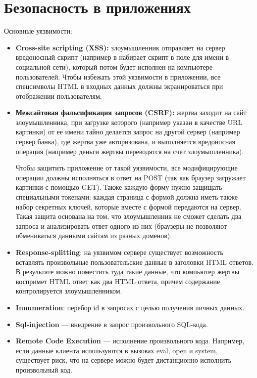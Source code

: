 \section{Безопасность в приложениях} %
Основные уязвимости:
\begin{itemize}
  \item \textbf{Cross-site scripting (XSS):} злоумышленник отправляет на сервер вредоносный скрипт (например в набирает скрипт в поле для имени в социальной сети), который потом будет исполнен на компьютере пользователей. Чтобы избежать этой уязвимости в приложении, все спецсимволы HTML в входных данных должны экранироваться при отображении пользователям.

  \item \textbf{Межсайтовая фальсификация запросов (CSRF):} жертва заходит на сайт злоумышленника, при загрузке которого (например указан в качестве URL картинки) от ее имени тайно делается запрос на другой сервер (например сервер банка), где жертва уже авторизована, и выполняется вредоносная операция (например деньги жертвы переводятся на счет злоумышленника).

  Чтобы защитить приложение от такой уязвимости, все модифицирующие операции должны исполняться в ответ на POST (так как браузер загружает картинки с помощью GET). Также каждую форму нужно защищать специальными токенами: каждая страница с формой должна иметь также набор секретных ключей, которые вместе с формой передаются на сервер. Такая защита основана на том, что злоумышленник не сможет сделать два запроса и анализировать ответ одного из них (браузеры не позволяют обмениваться данными сайтам из разных доменов).

  \item \textbf{Response-splitting}: на уязвимом сервере существует возможность вставлять произвольные пользовательские данные в заголовки HTML ответов. В результате можно поместить туда такие данные, что компьютер жертвы воспримет HTML ответ как два HTML ответа, причем содержание контролируется злоумышленником.

  \item \textbf{Innumeration}: перебор id в запросах с целью получения личных данных.
  \item \textbf{Sql-injection} --- внедрение в запрос произвольного SQL-кода.
  \item \textbf{Remote Code Execution} --- исполнение произвольного кода. Например, если данные клиента используются в вызовах eval, open и system, существует риск, что на сервере можно будет дистанционно исполнить произвольный код.
\end{itemize}
